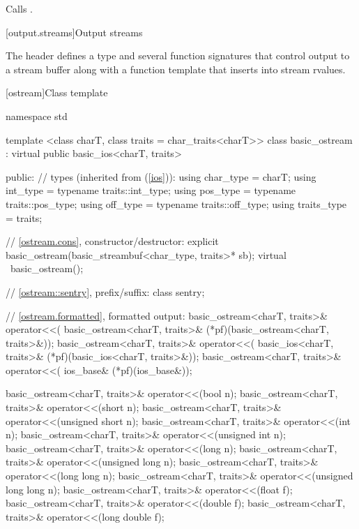 \begin{itemdescr}
\pnum
\effects Calls .
\end{itemdescr}


[output.streams]{Output streams}

\pnum
The header
defines a type
and several function signatures that control output to a
stream buffer along with a function template that inserts into stream rvalues.

[ostream]{Class template }

%
\begin{codeblock}
namespace std {
  template <class charT, class traits = char_traits<charT>>
  class basic_ostream
    : virtual public basic_ios<charT, traits> {
  public:
    // types (inherited from  (\ref{ios})):
    using char_type   = charT;
    using int_type    = typename traits::int_type;
    using pos_type    = typename traits::pos_type;
    using off_type    = typename traits::off_type;
    using traits_type = traits;

    // \ref{ostream.cons}, constructor/destructor:
    explicit basic_ostream(basic_streambuf<char_type, traits>* sb);
    virtual ~basic_ostream();

    // \ref{ostream::sentry}, prefix/suffix:
    class sentry;

    // \ref{ostream.formatted}, formatted output:
    basic_ostream<charT, traits>& operator<<(
      basic_ostream<charT, traits>& (*pf)(basic_ostream<charT, traits>&));
    basic_ostream<charT, traits>& operator<<(
      basic_ios<charT, traits>& (*pf)(basic_ios<charT, traits>&));
    basic_ostream<charT, traits>& operator<<(
      ios_base& (*pf)(ios_base&));

    basic_ostream<charT, traits>& operator<<(bool n);
    basic_ostream<charT, traits>& operator<<(short n);
    basic_ostream<charT, traits>& operator<<(unsigned short n);
    basic_ostream<charT, traits>& operator<<(int n);
    basic_ostream<charT, traits>& operator<<(unsigned int n);
    basic_ostream<charT, traits>& operator<<(long n);
    basic_ostream<charT, traits>& operator<<(unsigned long n);
    basic_ostream<charT, traits>& operator<<(long long n);
    basic_ostream<charT, traits>& operator<<(unsigned long long n);
    basic_ostream<charT, traits>& operator<<(float f);
    basic_ostream<charT, traits>& operator<<(double f);
    basic_ostream<charT, traits>& operator<<(long double f);

}}
\end{codeblock}
